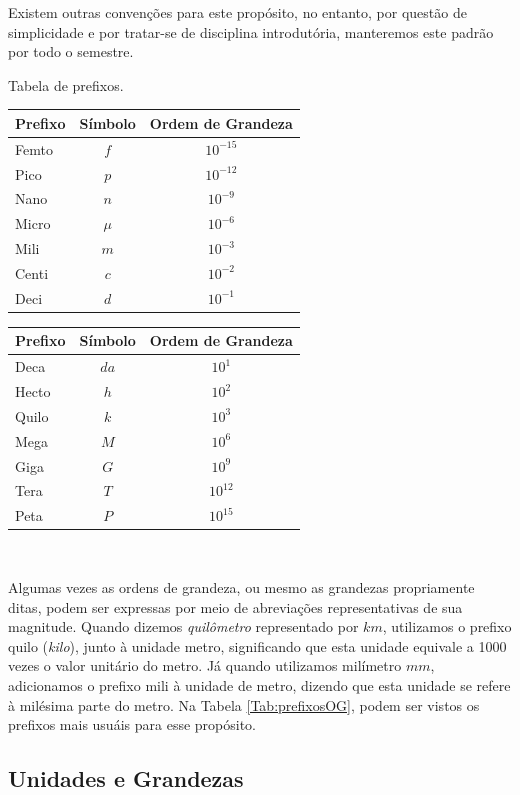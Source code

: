 \documentclass[a4paper, 11pt]{report}
\begin{document}
Existem outras convenções para este propósito, no entanto, por questão de 
simplicidade e por tratar-se de disciplina introdutória, manteremos este padrão
por todo o semestre. 

\begin{statictable}
    \caption{Tabela de prefixos.}
    \label{Tab:prefixosOG}
    \begin{tabular}{lcc}
        \textbf{Prefixo} & \textbf{Símbolo} & \textbf{Ordem de Grandeza} \\
        \hline
        Femto	& $f$	& $10^{-15}$ \\
        Pico	& $p$	& $10^{-12}$ \\
        Nano	& $n$	& $10^{-9}$ \\
        Micro	& $\mu$	& $10^{-6}$ \\
        Mili	& $m$	& $10^{-3}$ \\
        Centi	& $c$	& $10^{-2}$ \\
        Deci	& $d$	& $10^{-1}$ \\
        \hline
    \end{tabular}
    \begin{tabular}{lcc}
        \textbf{Prefixo} & \textbf{Símbolo} & \textbf{Ordem de Grandeza} \\
        \hline
        Deca	& $da$	& $10^{1}$ \\
        Hecto	& $h$	& $10^{2}$ \\
        Quilo	& $k$	& $10^{3}$ \\
        Mega	& $M$	& $10^{6}$ \\
        Giga	& $G$	& $10^{9}$ \\
        Tera	& $T$	& $10^{12}$ \\   
        Peta    & $P$   & $10^{15}$ \\
        \hline
    \end{tabular}\\
\end{statictable}

Algumas vezes as ordens de grandeza, ou mesmo as grandezas propriamente ditas, 
podem ser expressas por meio de abreviações representativas de sua magnitude. 
Quando dizemos \emph{quilômetro} representado por $km$, utilizamos o prefixo 
quilo (\emph{kilo}), junto à unidade metro, significando que esta unidade 
equivale a 1000 vezes o valor unitário do metro. Já quando utilizamos milímetro
$mm$, adicionamos o prefixo mili à unidade de metro, dizendo que esta unidade se
refere à milésima parte do metro. Na Tabela \ref{Tab:prefixosOG}, podem ser 
vistos os prefixos mais usuáis para esse propósito.

\subsection{Unidades e Grandezas}



\label{lastpage}
\end{document}
